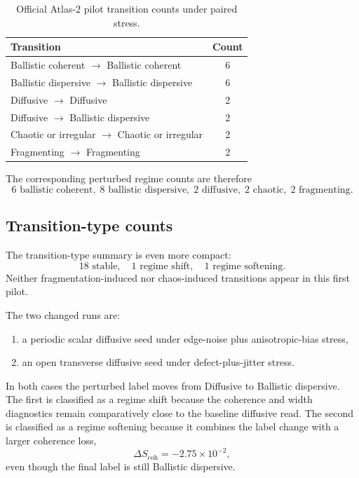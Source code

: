 \documentclass[11pt]{article}
\begin{document}
\begin{table}[t]
\centering
\begin{tabular}{lc}
\hline
Transition & Count \\
\hline
Ballistic coherent $\rightarrow$ Ballistic coherent & 6 \\
Ballistic dispersive $\rightarrow$ Ballistic dispersive & 6 \\
Diffusive $\rightarrow$ Diffusive & 2 \\
Diffusive $\rightarrow$ Ballistic dispersive & 2 \\
Chaotic or irregular $\rightarrow$ Chaotic or irregular & 2 \\
Fragmenting $\rightarrow$ Fragmenting & 2 \\
\hline
\end{tabular}
\caption{Official Atlas-2 pilot transition counts under paired stress.}
\label{tab:transition-counts}
\end{table}

The corresponding perturbed regime counts are therefore
\begin{equation}
6 \text{ ballistic coherent},\;
8 \text{ ballistic dispersive},\;
2 \text{ diffusive},\;
2 \text{ chaotic},\;
2 \text{ fragmenting}.
\end{equation}

\subsection{Transition-type counts}
The transition-type summary is even more compact:
\begin{equation}
18 \text{ stable},\quad 1 \text{ regime shift},\quad 1 \text{ regime softening}.
\end{equation}
Neither fragmentation-induced nor chaos-induced transitions appear in this first pilot.

The two changed runs are:
\begin{enumerate}
\item a periodic scalar diffusive seed under edge-noise plus anisotropic-bias stress,
\item an open transverse diffusive seed under defect-plus-jitter stress.
\end{enumerate}
In both cases the perturbed label moves from Diffusive to Ballistic dispersive. The first is classified as a regime shift because the coherence and width diagnostics remain comparatively close to the baseline diffusive read. The second is classified as a regime softening because it combines the label change with a larger coherence loss,
\begin{equation}
\Delta S_{\mathrm{coh}} = -2.75 \times 10^{-2},
\end{equation}
even though the final label is still Ballistic dispersive.
\end{document}
